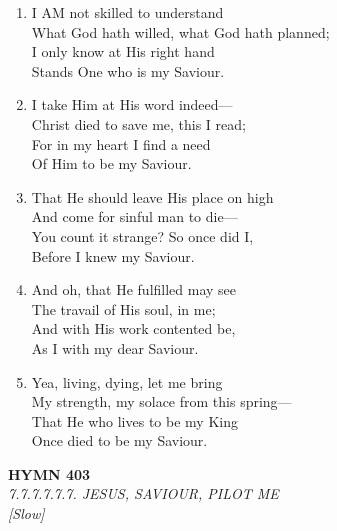 \begin{enumerate}
    \item I AM not skilled to understand \\
        What God hath willed, what God hath planned; \\
        I only know at His right hand \\
        Stands One who is my Saviour.

    \item I take Him at His word indeed--- \\
        Christ died to save me, this I read; \\
        For in my heart I find a need \\
        Of Him to be my Saviour.

    \item That He should leave His place on high \\
        And come for sinful man to die--- \\
        You count it strange? So once did I, \\
        Before I knew my Saviour.

    \item And oh, that He fulfilled may see \\
        The travail of His soul, in me; \\
        And with His work contented be, \\
        As I with my dear Saviour.

    \item Yea, living, dying, let me bring \\
        My strength, my solace from this spring--- \\
        That He who lives to be my King \\
        Once died to be my Saviour.

\end{enumerate}

\newpage
\begin{center}
    {\Large \textbf{HYMN 403}}
    \\
    \textit{7.7.7.7.7.7. JESUS, SAVIOUR, PILOT ME}
    \\
    \textit{\small [Slow]}
\end{center}
\vspace{1em}

